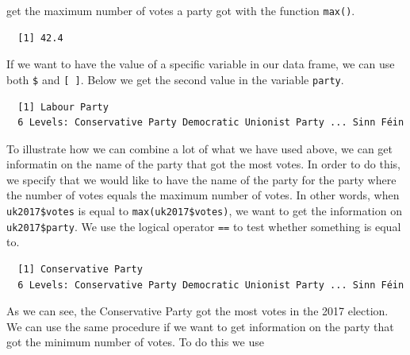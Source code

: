 \documentclass[12pt,oneside]{reedthesis}
\theoremstyle{definition}
\theoremstyle{definition}
\theoremstyle{definition}
\theoremstyle{remark}
\begin{document}
  get the maximum number of votes a party got with the function
  \texttt{max()}.
  \begin{Shaded}
  \begin{Highlighting}[]
  \OperatorTok{$}
  \end{Highlighting}
  \end{Shaded}
  \begin{verbatim}
  [1] 42.4
  \end{verbatim}
  If we want to have the value of a specific variable in our data frame,
  we can use both \texttt{\$} and \texttt{{[}\ {]}}. Below we get the
  second value in the variable \texttt{party}.
  \begin{Shaded}
  \begin{Highlighting}[]
  \OperatorTok{$}\NormalTok{party[}\NormalTok{]}
  \end{Highlighting}
  \end{Shaded}
  \begin{verbatim}
  [1] Labour Party
  6 Levels: Conservative Party Democratic Unionist Party ... Sinn Féin
  \end{verbatim}
  To illustrate how we can combine a lot of what we have used above, we
  can get informatin on the name of the party that got the most votes. In
  order to do this, we specify that we would like to have the name of the
  party for the party where the number of votes equals the maximum number
  of votes. In other words, when \texttt{uk2017\$votes} is equal to
  \texttt{max(uk2017\$votes)}, we want to get the information on
  \texttt{uk2017\$party}. We use the logical operator \texttt{==} to test
  whether something is equal to.
  \begin{Shaded}
  \begin{Highlighting}[]
  \OperatorTok{$}\NormalTok{party[uk2017}\OperatorTok{$}\OperatorTok{==}\StringTok{ }\OperatorTok{$}\NormalTok{votes)]}
  \end{Highlighting}
  \end{Shaded}
  \begin{verbatim}
  [1] Conservative Party
  6 Levels: Conservative Party Democratic Unionist Party ... Sinn Féin
  \end{verbatim}
  As we can see, the Conservative Party got the most votes in the 2017
  election. We can use the same procedure if we want to get information on
  the party that got the minimum number of votes. To do this we use
\end{document}
